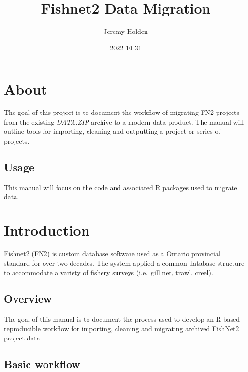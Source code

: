 \documentclass[
]{book}
\title{Fishnet2 Data Migration}
\author{Jeremy Holden}
\date{2022-10-31}
\begin{document}
\maketitle

{
\setcounter{tocdepth}{1}
\tableofcontents
}
\hypertarget{about}{%
\chapter{About}\label{about}}

The goal of this project is to document the workflow of migrating FN2 projects from the existing \emph{DATA.ZIP} archive to a modern data product. The manual will outline tools for importing, cleaning and outputting a project or series of projects.

\hypertarget{usage}{%
\section{Usage}\label{usage}}

This manual will focus on the code and associated R packages used to migrate data.

\hypertarget{introduction}{%
\chapter{Introduction}\label{introduction}}

Fishnet2 (FN2) is custom database software used as a Ontario provincial standard for over two decades. The system applied a common database structure to accommodate a variety of fishery surveys (i.e.~gill net, trawl, creel).

\hypertarget{overview}{%
\section{Overview}\label{overview}}

The goal of this manual is to document the process used to develop an R-based reproducible workflow for importing, cleaning and migrating archived FishNet2 project data.

\hypertarget{basic-workflow}{%
\section{Basic workflow}\label{basic-workflow}}
\end{document}

